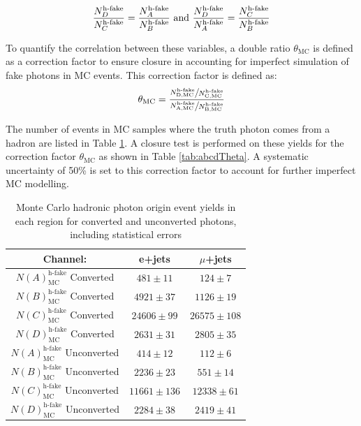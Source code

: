 \[\frac{N_D^{\text{h-fake}}}{N_C^{\text{h-fake}}}=\frac{N_A^{\text{h-fake}}}{N_B^{\text{h-fake}}}
\\ \text{ and } \\
\frac{N_D^{\text{h-fake}}}{N_A^{\text{h-fake}}}=\frac{N_C^{\text{h-fake}}}{N_B^{\text{h-fake}}}
\]

To quantify the correlation between these variables, a double ratio $\theta_{\text{MC}}$ is defined as a correction factor to ensure closure in accounting for imperfect simulation of fake photons in MC events. This correction factor is defined as:
\[\theta_{\text{MC}}=\frac
{\sfrac{N_\text{D,MC}^{\text{h-fake}}}{N_\text{C,MC}^{\text{h-fake}}}}
{\sfrac{N_\text{A,MC}^{\text{h-fake}}}{N_\text{B,MC}^{\text{h-fake}}}}
\]
 
 The number of events in MC samples where the truth photon comes from a hadron are listed in Table \ref{tab:abcdYieldsMC}.  A closure test is performed on these yields for the correction factor $\theta_\text{MC}$ as shown in Table \ref{tab:abcdTheta}.  A systematic uncertainty of 50\% is set to this correction factor to account for further imperfect MC modelling.
\begin{table}[h]
\begin{center}
{\renewcommand{\arraystretch}{1.2}
\begin{tabular}{c|c|c}
\hline
Channel:     &  e+jets   &$\mu$+jets \\  \hline 
$N(A)^\text{h-fake}_\text{MC}$ Converted & $481 \pm 11 $   &  $124\pm 7$	\\ 
$N(B)^\text{h-fake}_\text{MC}$ Converted & $4921 \pm 37 $   &  $1126\pm 19 $      \\ 
$N(C)^\text{h-fake}_\text{MC}$ Converted & $24606 \pm 99 $   &  $26575\pm 108 $    \\ 
$N(D)^\text{h-fake}_\text{MC}$ Converted & $2631 \pm 31 $   &  $2805\pm 35$      \\ \hline %
$N(A)^\text{h-fake}_\text{MC}$ Unconverted & $414\pm 12$         &  $112\pm 6$	\\ 
$N(B)^\text{h-fake}_\text{MC}$ Unconverted & $2236\pm 23$       &  $551 \pm 14$       \\ 
$N(C)^\text{h-fake}_\text{MC}$ Unconverted & $11661\pm 136$   &  $12338\pm61$     \\ 
$N(D)^\text{h-fake}_\text{MC}$ Unconverted & $2284\pm38$        &  $2419 \pm 41$       \\ \hline
\end{tabular}
\caption{Monte Carlo hadronic photon origin event yields in each region for converted and unconverted photons, including statistical errors  }
\label{tab:abcdYieldsMC}
}
\end{center}
\end{table}

